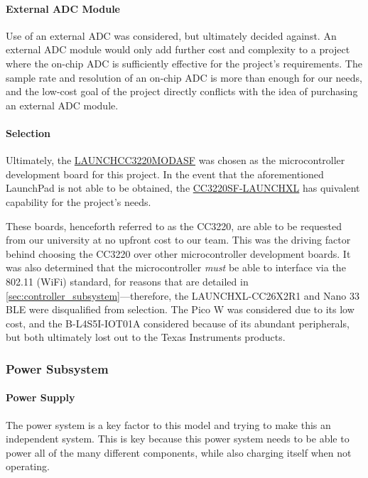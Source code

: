 \paragraph{External ADC Module} Use of an external ADC was considered, but ultimately decided against. An external ADC module would only add further cost and complexity to a project where the on-chip ADC is sufficiently effective for the project's requirements. The sample rate and resolution of an on-chip ADC is more than enough for our needs, and the low-cost goal of the project directly conflicts with the idea of purchasing an external ADC module.

\paragraph{Selection} Ultimately, the \href{https://www.ti.com/tool/LAUNCHCC3220MODASF}{LAUNCHCC3220MODASF} was chosen as the microcontroller development board for this project. In the event that the aforementioned LaunchPad is not able to be obtained, the \href{https://www.ti.com/tool/CC3220SF-LAUNCHXL}{CC3220SF-LAUNCHXL} has  quivalent capability for the project's needs.

These boards, henceforth referred to as the CC3220, are able to be requested from our university at no upfront cost to our team. This was the driving factor behind choosing the CC3220 over other microcontroller development boards. It was also determined that the microcontroller \emph{must} be able to interface via the 802.11 (WiFi) standard, for reasons that are detailed in \autoref{sec:controller_subsystem}---therefore, the LAUNCHXL-CC26X2R1 and Nano 33 BLE were disqualified from selection. The Pico W was considered due to its low cost, and the B-L4S5I-IOT01A considered because of its abundant peripherals, but both ultimately lost out to the Texas Instruments products.

\subsubsection{Power Subsystem}
\paragraph{Power Supply}
The power system is a key factor to this model and trying to make this an independent system. This is key because this power system needs to be able to power all of the many different components, while also charging itself when not operating.


